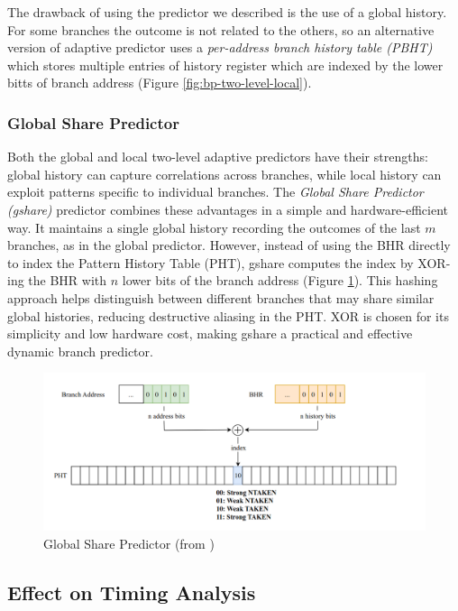 The drawback of using the predictor we described is the use of a global history. For some branches the outcome is not related to the others, so an alternative version of adaptive predictor uses a \textit{per-address branch history table (PBHT)} which stores multiple entries of history register which are indexed by the lower bitts of branch address (Figure \ref{fig:bp-two-level-local}).



\subsubsection{Global Share Predictor}

Both the global and local two-level adaptive predictors have their strengths: global history can capture correlations across branches, while local history can exploit patterns specific to individual branches. The \textit{Global Share Predictor (gshare)} predictor combines these advantages in a simple and hardware-efficient way. It maintains a single global history recording the outcomes of the last $m$ branches, as in the global predictor. However, instead of using the BHR directly to index the Pattern History Table (PHT), gshare computes the index by XOR-ing the BHR with $n$ lower bits of the branch address (Figure \ref{fig:bp-gshare}). This hashing approach helps distinguish between different branches that may share similar global histories, reducing destructive aliasing in the PHT. XOR is chosen for its simplicity and low hardware cost, making gshare a practical and effective dynamic branch predictor.

\begin{figure}
    \includegraphics[width=\textwidth]{figures/bp-gshare.png}
    \caption{Global Share Predictor (from \cite{mahling_reverse_2023})}
    \label{fig:bp-gshare}
\end{figure}

\subsection{Effect on Timing Analysis}

